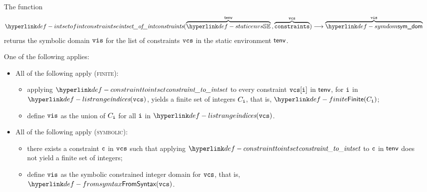 \FormallyParagraph
\begin{mathpar}
\end{mathpar}

\hypertarget{def-intsetofintconstraintse}{}
The function
\[
  \intsetofintconstraints(
    \overname{\staticenvs}{\tenv} \aslsep
    \overname{\constraints}{\vcs}
  ) \aslto
  \overname{\symdom}{\vis}
\]
returns the symbolic domain $\vis$ for the list of constraints $\vcs$
in the static environment $\tenv$.

\ProseParagraph
One of the following applies:
\begin{itemize}
  \item All of the following apply (\textsc{finite}):
  \begin{itemize}
    \item applying $\constrainttointset$ to every constraint $\vcs[\vi]$ in $\tenv$, for $\vi$ in \\ $\listrange(\vcs)$,
          yields a finite set of integers $C_\vi$, that is, $\Finite(C_\vi)$;
    \item define $\vis$ as the union of $C_\vi$ for all $\vi$ in $\listrange(\vcs)$.
  \end{itemize}

  \item All of the following apply (\textsc{symbolic}):
  \begin{itemize}
    \item there exists a constraint $\vc$ in $\vcs$ such that applying $\constrainttointset$ to $\vc$
          in $\tenv$ does not yield a finite set of integers;
    \item define $\vis$ as the symbolic constrained integer domain for $\vcs$, that is, \\
          $\FromSyntax(\vcs)$.
  \end{itemize}
\end{itemize}

\FormallyParagraph
\begin{mathpar}
\end{mathpar}

\begin{mathpar}
\end{mathpar}

